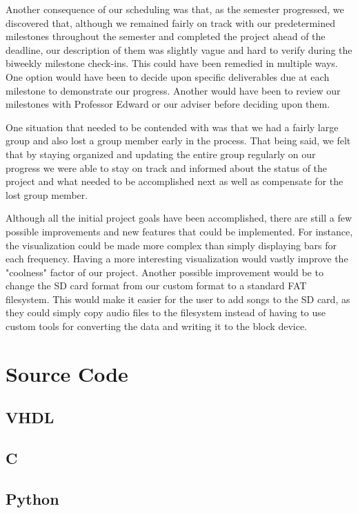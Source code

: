\documentclass{article}
\begin{document}
Another consequence of our scheduling was that, as the semester progressed, 
we discovered that, although we remained fairly on track with our predetermined 
milestones throughout the semester and completed the project ahead of the 
deadline, our description of them was slightly vague and hard to verify during 
the biweekly milestone check-ins. This could have been remedied in multiple ways. 
One option would have been to decide upon specific deliverables due at each 
milestone to demonstrate our progress. Another would have been to review our 
milestones with Professor Edward or our adviser before deciding upon them.

One situation that needed to be contended with was that we had a fairly large 
group and also lost a group member early in the process.  That being said, 
we felt that by staying organized and updating the entire group regularly on 
our progress we were able to stay on track and informed about the status of the 
project and what needed to be accomplished next as well as compensate for the 
lost group member.

Although all the initial project goals have been accomplished, there are still 
a few possible improvements and new features that could be implemented.
For instance, the visualization could be made more complex than simply 
displaying bars for each frequency. Having a more interesting visualization 
would vastly improve the "coolness" factor of our project. Another possible 
improvement would be to change the SD card format from our custom format to a 
standard FAT filesystem. This would make it easier for the user to add songs to 
the SD card, as they could simply copy audio files to the filesystem instead of 
having to use custom tools for converting the data and writing it to the block 
device.
 
 \appendix
\section{Source Code}
 \subsection{VHDL}
 \subsection{C}
 \subsection{Python} %
 
\end{document}
